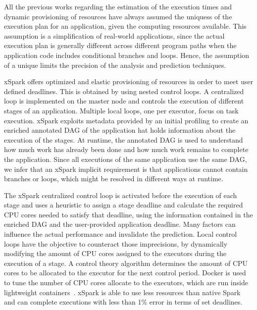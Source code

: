 All the previous works regarding the estimation of the execution times and dynamic provisioning of resources have always assumed the uniquess of the execution plan for an application, given the computing resources available. This assumption is a simplification of real-world applications, since the actual execution plan is generally different across different program paths when the application code includes conditional branches and loops. Hence, the assumption of a unique \plan limits the precision of the analysis and prediction techniques.

xSpark offers optimized and elastic provisioning of resources in order to meet user defined deadlines. This is obtained by using nested control loops. A centralized loop is implemented on the master node and controls the execution of different stages of an application. Multiple local loops, one per executor, focus on task execution. xSpark exploits metadata provided by an initial profiling to create an enriched annotated DAG of the application hat holds information about the execution of the stages. At runtime, the annotated DAG is used to understand how much work has already been done and how much work remains to complete the application. Since all executions of the same application use the same DAG, we infer that an xSpark implicit requirement is that applications cannot contain branches or loops, which might be resolved in different ways at runtime. 

The xSpark centralized control loop is activated before the execution of each stage and uses a heuristic to assign a stage deadline and calculate the required CPU cores needed to satisfy that deadline, using the information contained in the enriched DAG and the user-provided  application deadline. Many factors can influence the actual performance and invalidate the prediction. Local control loops have the objective to counteract those imprecisions, by dynamically modifying the amount of CPU cores assigned to the executors during the execution of a stage. A control theory algorithm determines the amount of CPU cores to be allocated to the executor for the next control period. Docker is used to tune the number of CPU cores allocate to the executors, which are run inside lightweight containers~\cite{misc:Docker}. xSpark is able to use less resources than native Spark and can complete executions with less than 1\% error in terms of set deadlines.


